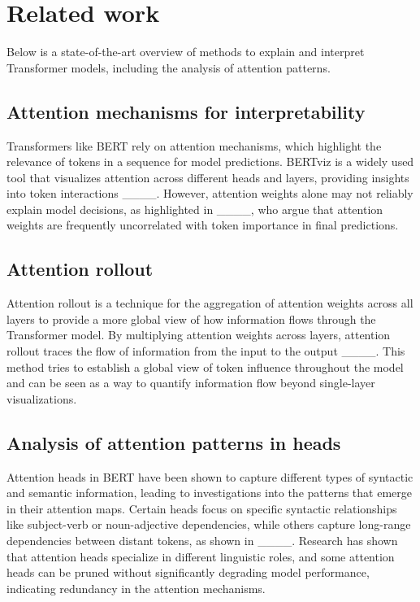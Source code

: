 \section{Related work}
Below is a state-of-the-art overview of methods to explain and interpret Transformer models, including the analysis of attention patterns.

\subsection{Attention mechanisms for interpretability}
Transformers like BERT rely on attention mechanisms, which highlight the relevance of tokens in a sequence for model predictions. BERTviz is a widely used tool that visualizes attention across different heads and layers, providing insights into token interactions ____. However, attention weights alone may not reliably explain model decisions, as highlighted in ____, who argue that attention weights are frequently uncorrelated with token importance in final predictions.

\subsection{Attention rollout}
Attention rollout is a technique for the aggregation of attention weights across all layers to provide a more global view of how information flows through the Transformer model. 
By multiplying attention weights across layers, attention rollout traces the flow of information from the input to the output ____. This method tries to establish a global view of token influence throughout the model and can be seen as a way to quantify information flow beyond single-layer visualizations.

\subsection{Analysis of attention patterns in heads}
Attention heads in BERT have been shown to capture different types of syntactic and semantic information, leading to investigations into the patterns that emerge in their attention maps. Certain heads focus on specific syntactic relationships like subject-verb or noun-adjective dependencies, while others capture long-range dependencies between distant tokens, as shown in ____. Research has shown that attention heads specialize in different linguistic roles, and some attention heads can be pruned without significantly degrading model performance, indicating redundancy in the attention mechanisms.

